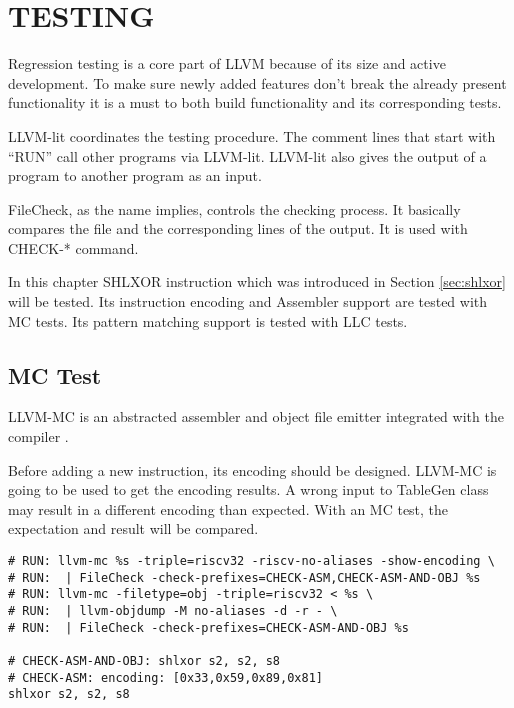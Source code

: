 \clearpage
\chapter{TESTING}\label{Ch10}
Regression testing is a core part of LLVM because of its size and active development. To make sure newly added features don’t break the already present functionality it is a must to both build functionality and its corresponding tests.

LLVM-lit coordinates the testing procedure. The comment lines that start with “RUN” call other programs via LLVM-lit. LLVM-lit also gives the output of a program to another program as an input.

FileCheck, as the name implies, controls the checking process. It basically compares the file and the corresponding lines of the output. It is used with CHECK-* command.

In this chapter SHLXOR instruction which was introduced in Section \ref{sec:shlxor} will be tested. Its instruction encoding and Assembler support are tested with MC tests. Its pattern matching support is tested with LLC tests.   
\section{MC Test}
LLVM-MC is an abstracted assembler and object file emitter integrated with the compiler \cite{Lattner2010Apr}.

Before adding a new instruction, its encoding should be designed. LLVM-MC is going to be used to get the encoding results. A wrong input to TableGen class may result in a different encoding than expected. With an MC test, the expectation and result will be compared. 

\begin{minipage}{\linewidth}
\begin{lstlisting}[caption={MC Test File}, label={lst:mc_test_file} ]
# RUN: llvm-mc %s -triple=riscv32 -riscv-no-aliases -show-encoding \ 
# RUN: 	| FileCheck -check-prefixes=CHECK-ASM,CHECK-ASM-AND-OBJ %s 
# RUN: llvm-mc -filetype=obj -triple=riscv32 < %s \ 
# RUN: 	| llvm-objdump -M no-aliases -d -r - \ 
# RUN: 	| FileCheck -check-prefixes=CHECK-ASM-AND-OBJ %s 

# CHECK-ASM-AND-OBJ: shlxor s2, s2, s8 
# CHECK-ASM: encoding: [0x33,0x59,0x89,0x81] 
shlxor s2, s2, s8
\end{lstlisting}
\end{minipage}


